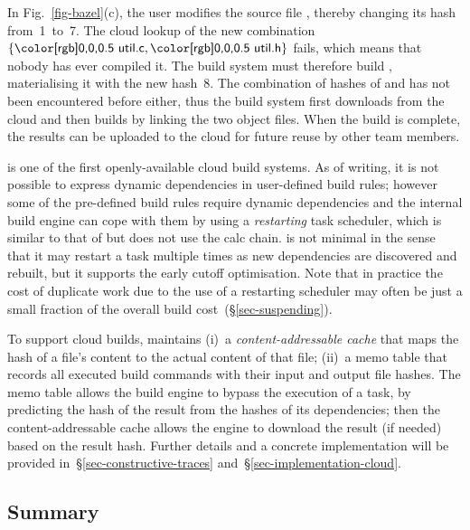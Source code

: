In Fig.~\ref{fig-bazel}(c), the user modifies the source file ,
thereby changing its hash from~1~to~7. The cloud lookup of the new combination
$\{\cmd{util.c}, \cmd{util.h}\}$ fails, which means that nobody has ever
compiled it. The build system must therefore build , materialising
it with the new hash~8. The combination of hashes of  and
 has not been encountered before either, thus the build system first
downloads  from the cloud and then builds  by linking
the two object files. When the build is complete, the results can be uploaded to
the cloud for future reuse by other team members.

\Bazel is one of the first openly-available cloud build systems.
As of writing, it is not possible to express dynamic dependencies in
user-defined build rules; however some of the pre-defined build rules require
dynamic dependencies and the internal build engine can cope with them by using
a \emph{restarting} task scheduler, which is similar to that of \Excel but does
not use the calc chain. \Bazel is not minimal in the sense that it may restart a
task multiple times as new dependencies are discovered and rebuilt, but it
supports the early cutoff optimisation. Note that in practice the cost of
duplicate work due to the use of a restarting scheduler may often be just a
small fraction of the overall build cost~(\S\ref{sec-suspending}).

To support cloud builds, \Bazel maintains (i)~a \emph{content-addressable cache}
that maps the hash of a file's content to the actual content of that file;
(ii)~a memo table that records all executed build commands
with their input and output file hashes.
The memo table allows the build engine to bypass the execution
of a task, by predicting the hash of the result from the hashes of its
dependencies; then the content-addressable cache allows the engine
to download the result (if needed) based on the result hash. Further details
and a concrete implementation will be provided
in~\S\ref{sec-constructive-traces} and~\S\ref{sec-implementation-cloud}.

\subsection{Summary}\label{sec-background-summary}

